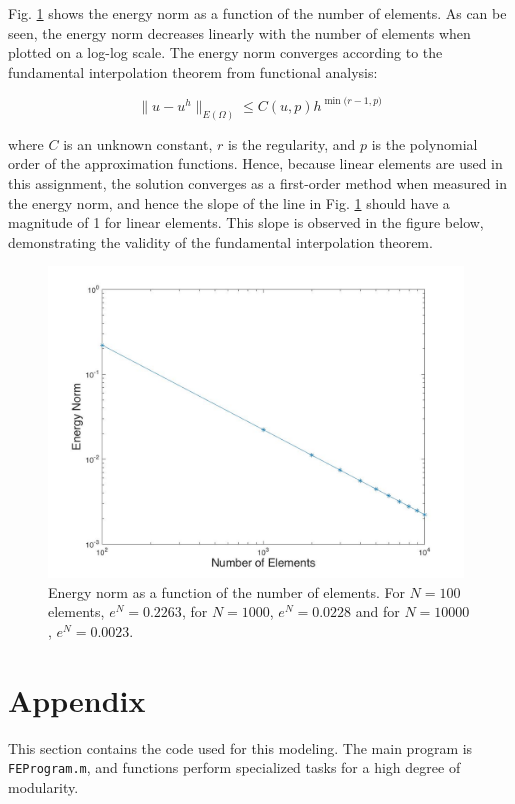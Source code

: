 \documentclass[10pt]{article}
\begin{document}
Fig. \ref{fig:eN_vs_N} shows the energy norm as a function of the number of elements. As can be seen, the energy norm decreases linearly with the number of elements when plotted on a log-log scale. The energy norm converges according to the fundamental interpolation theorem from functional analysis:

\begin{equation}
\label{eq:Theorem}
\|u-u^h\|_{E(\Omega)}\leq C(u, p)h^{\min{(r-1, p})}
\end{equation}

where \(C\) is an unknown constant, \(r\) is the regularity, and \(p\) is the polynomial order of the approximation functions. Hence, because linear elements are used in this assignment, the solution converges as a first-order method when measured in the energy norm, and hence the slope of the line in Fig. \ref{fig:eN_vs_N} should have a magnitude of 1 for linear elements. This slope is observed in the figure below, demonstrating the validity of the fundamental interpolation theorem.

\begin{figure}[H]
  \centering
  \includegraphics[width=11cm]{eN_vs_N.jpg}
  \caption{Energy norm as a function of the number of elements. For \(N=100\) elements, \(e^N=0.2263\), for \(N=1000\), \(e^N=0.0228\) and for \(N=10000\), \(e^N=0.0023\).}
  \label{fig:eN_vs_N}
\end{figure}

\section{Appendix}

This section contains the code used for this modeling. The main program is \texttt{FEProgram.m}, and functions perform specialized tasks for a high degree of modularity.
\end{document}
